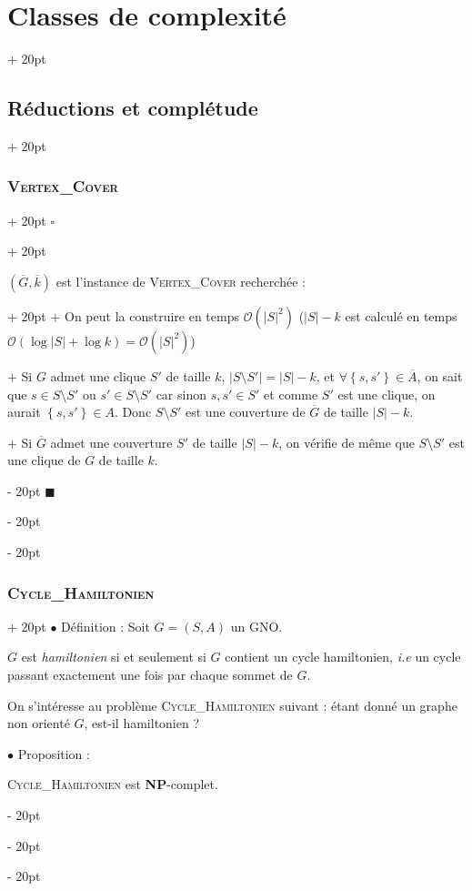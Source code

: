 \documentclass[a4paper, 12pt, twoside]{article}
\newcommand{\cj}[1]{\overline{#1}} %
\newcommand{\lr}[1]{\left( #1 \right)}
\newcommand{\set}[1]{\left\{ #1 \right\}}
\newcommand{\abs}[1]{\left\lvert #1 \right\rvert}
\newcommand{\ind}[1][20pt]{\advance\leftskip + #1}
\newcommand{\deind}[1][20pt]{\advance\leftskip - #1}
\newenvironment{indt}[2][20pt]{#2 \par \ind[#1]}{\par \deind} %
\newenvironment{proof}[1][{}]{\begin{indt}{$\square$ #1}}{$\blacksquare$ \end{indt}}
\begin{document}
\begin{indt}{\section{Classes de complexité}}
\begin{indt}{\subsection{Réductions et complétude}}
\begin{indt}{\subsubsection{\textsc{Vertex\_Cover}}}
\begin{proof}
                    \vspace{6pt}
                    
                    \begin{indt}{$(\cj G, \cj k)$ est l'instance de \textsc{Vertex\_Cover} recherchée :}
                        $+$ On peut la construire en temps $\mathcal O\!\lr{\abs S ^2}$ ($\abs S - k$ est calculé en temps $\mathcal O(\log \abs S + \log k) = \mathcal O\!\lr{\abs S ^2}$)
                        
                        $+$ Si $G$ admet une clique $S'$ de taille $k$, $\abs{S \setminus S'} = \abs S - k$, et $\forall \set{s, s'} \in \cj A$, on sait que $s \in S \setminus S'$ ou $s' \in S \setminus S'$ car sinon $s, s' \in S'$ et comme $S'$ est une clique, on aurait $\set{s, s'} \in A$.
                        Donc $S \setminus S'$ est une couverture de $\cj G$ de taille $\abs S - k$.
                        
                        $+$ Si $\cj G$ admet une couverture $S'$ de taille $\abs S - k$, on vérifie de même que $S \setminus S'$ est une clique de $G$ de taille $k$.
                    \end{indt}
                \end{proof}
            \end{indt}

            \vspace{12pt}
            
            \begin{indt}{\subsubsection{\textsc{Cycle\_Hamiltonien}}}
                $\bullet$ Définition : Soit $G = (S, A)$ un GNO.

                $G$ est \emph{hamiltonien} si et seulement si $G$ contient un cycle hamiltonien, \textit{i.e} un cycle passant exactement une fois par chaque sommet de $G$.

                \vspace{6pt}
                
                On s'intéresse au problème \textsc{Cycle\_Hamiltonien} suivant : étant donné un graphe non orienté $G$, est-il hamiltonien ?

                \vspace{12pt}
                
                $\bullet$ Proposition :
                \begin{emphBox}
                    \textsc{Cycle\_Hamiltonien} est \textbf{NP}-complet.
                \end{emphBox}


\end{indt}
\end{indt}
\end{indt}
\end{document}

